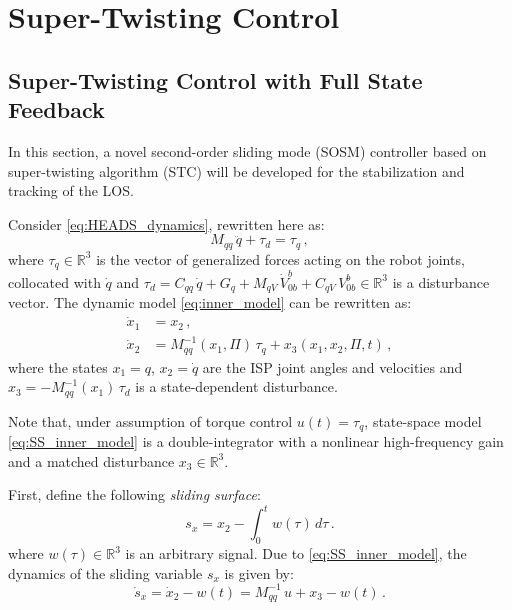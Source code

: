 \section{Super-Twisting Control}

\subsection{Super-Twisting Control with Full State Feedback}
\label{sec:STC_state_feedback}

In this section, a novel second-order sliding mode (SOSM) controller based on super-twisting algorithm (STC) will be developed for the stabilization and tracking of the LOS.

Consider \eqref{eq:HEADS_dynamics}, rewritten here as:
%
\begin{equation}
M_{qq} \, \ddot{q} + \tau_d = \tau_q \,,
\label{eq:inner_model}
\end{equation}
%
where $\tau_q \in \mathbb{R}^{3}$ is the vector of generalized forces acting on the robot joints, collocated with $\dot{q}$ and $\tau_d = C_{qq} \, \dot{q} + G_{q} + M_{qV} \, \dot{V}^{b}_{0b} + C_{qV} \, V^{b}_{0b} \in \mathbb{R}^{3}$ is a disturbance vector.
%
%
The dynamic model \eqref{eq:inner_model} can be rewritten as:
%
\begin{align}
\dot{x}_1 &= x_2 \,, \nonumber \\
\dot{x}_2 &= M^{-1}_{qq}(x_1,\Pi)\,\tau_q + x_3(x_1,x_2,\Pi,t) \,,
\label{eq:SS_inner_model}
\end{align}
%
where the states $x_1 = q$, $x_2 = \dot{q}$ are the ISP joint angles and velocities and $x_3 = -M^{-1}_{qq}(x_1) \,\tau_d$ is a state-dependent disturbance.

\begin{remark}
Note that, under assumption of torque control $u(t) = \tau_q$, state-space model \eqref{eq:SS_inner_model} is a double-integrator with a nonlinear high-frequency gain and a matched disturbance $x_3 \in \mathbb{R}^{3}$.
\end{remark}

First, define the following \textit{sliding surface}:
%
\begin{equation}
s_x = x_2 - \int^t_0{w(\tau)} \, d\tau\,. 
\label{eq:sx_sliding}
\end{equation}
%
where $w(\tau) \in \mathbb{R}^3$ is an arbitrary signal.
%
Due to \eqref{eq:SS_inner_model}, the dynamics of the sliding variable $s_x$ is given by:
%
\begin{equation}
\dot{s}_x = \dot{x}_2 - w(t) = M^{-1}_{qq} \, u + x_3 - w(t)\,.
\label{eq:dsx_sliding}
\end{equation}

